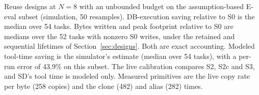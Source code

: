 \begin{table}[tbp]
  \caption{Reuse designs at $N=8$ with an unbounded budget on the assumption-based E-eval subset (simulation, 50
  resamples). DB-execution saving relative to S0 is the median over 54 tasks. Bytes written and peak footprint
  relative to S0 are medians over the 52 tasks with nonzero S0 writes, under the retained and sequential lifetimes of
  Section~\ref{sec:designs}. Both are exact accounting. Modeled tool-time saving is the simulator's estimate (median
  over 54 tasks), with a per-run error of 43.9\% on this subset. The live calibration
  compares S2, S2c and S3, and SD's tool time is modeled only. Measured primitives are the live copy rate per byte
  (258 copies) and the clone (482) and alias (282) times.}
  \label{tab:designs}
  \small
  
\end{table}
